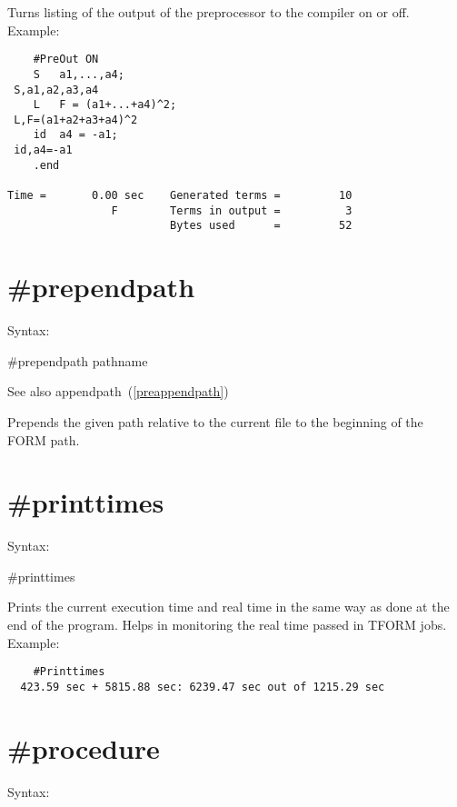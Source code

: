 \noindent Turns listing of the output of the preprocessor 
to the compiler on or off. Example:
\begin{verbatim}
    #PreOut ON
    S   a1,...,a4;
 S,a1,a2,a3,a4
    L   F = (a1+...+a4)^2;
 L,F=(a1+a2+a3+a4)^2
    id  a4 = -a1;
 id,a4=-a1
    .end

Time =       0.00 sec    Generated terms =         10
                F        Terms in output =          3
                         Bytes used      =         52
\end{verbatim}

 
\section{\#prependpath}
\label{preprependpath}

\noindent Syntax:

\#prependpath pathname

\noindent See also appendpath~(\ref{preappendpath})

\noindent Prepends the given path relative to the current file to the beginning
of the FORM path.

 
\section{\#printtimes}
\label{preprinttimes}

\noindent Syntax:

\#printtimes

\noindent Prints the current execution time and real 
time in the same way as done at the end of the program. Helps in monitoring 
the real time passed in TFORM jobs.
Example:
\begin{verbatim}
    #Printtimes
  423.59 sec + 5815.88 sec: 6239.47 sec out of 1215.29 sec
\end{verbatim}


\section{\#procedure}
\label{preprocedure}

\noindent Syntax:

